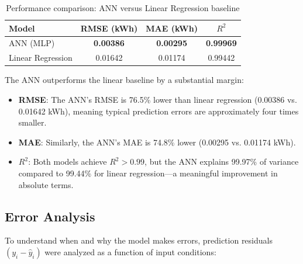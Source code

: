\documentclass[11pt, a4paper]{article}
\begin{document}
\begin{table}[H]
    \centering
    \caption{Performance comparison: ANN versus Linear Regression baseline}
    \label{tab:results}
    \begin{tcolorbox}[colback=lightgray, colframe=rulecolor, boxrule=0.5pt, arc=4mm, auto outer arc, width=0.98\textwidth, halign=center]
        \renewcommand{\arraystretch}{1.5}
        \begin{tabular}{@{}lccc@{}}
        \toprule
        \textbf{Model} & \textbf{RMSE (kWh)} & \textbf{MAE (kWh)} & \textbf{$R^2$} \\
        \midrule
        ANN (MLP) & \textbf{0.00386} & \textbf{0.00295} & \textbf{0.99969} \\
        Linear Regression & 0.01642 & 0.01174 & 0.99442 \\
        \bottomrule
        \end{tabular}
    \end{tcolorbox}
\end{table}

The ANN outperforms the linear baseline by a substantial margin:
\begin{itemize}
    \item \textbf{RMSE}: The ANN's RMSE is 76.5\% lower than linear regression
    (0.00386 vs. 0.01642 kWh), meaning typical prediction errors are
    approximately four times smaller.
    \item \textbf{MAE}: Similarly, the ANN's MAE is 74.8\% lower (0.00295 vs.
    0.01174 kWh).
    \item \textbf{$R^2$}: Both models achieve $R^2 > 0.99$, but the ANN explains
    99.97\% of variance compared to 99.44\% for linear regression---a
    meaningful improvement in absolute terms.
\end{itemize}

\subsection{Error Analysis}

To understand when and why the model makes errors, prediction residuals
$(y_i - \hat{y}_i)$ were analyzed as a function of input conditions:
\end{document}
